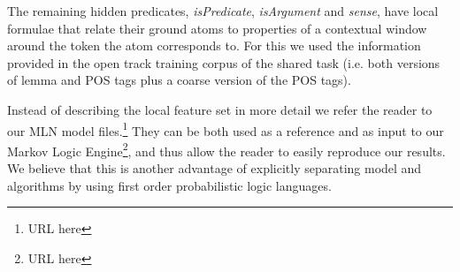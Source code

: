 The remaining hidden predicates, \emph{isPredicate}, \emph{isArgument} and \emph{sense}, have local formulae that relate their ground atoms to properties of a contextual window around the token the atom corresponds to. For this we used the information provided in the open track training corpus of the shared task (i.e. both versions of lemma and POS tags plus a coarse version of the POS tags). 

Instead of describing the local feature set in more detail we refer the reader to our MLN model files.\footnote{URL here} They can be both used as a reference and as input to our Markov Logic Engine\footnote{URL here}, and thus allow the reader to easily reproduce our results. We believe that this is another advantage of explicitly separating model and algorithms by using first order probabilistic logic languages.







 



